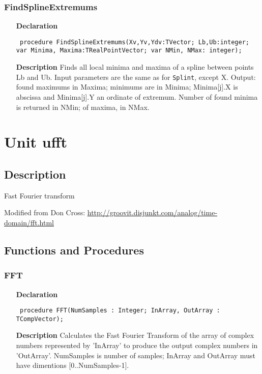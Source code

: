 \documentclass[12pt,a4paper,oneside]{report}
\newcommand{\declarationitem}[1]{\textbf{#1}}
\newcommand{\descriptiontitle}[1]{\textbf{#1}}
\newcommand{\code}[1]{\texttt{#1}}
\begin{document}
\subsubsection{FindSplineExtremums}
\label{uSpline-FindSplineExtremums}
\begin{itemize}\item[\declarationitem{Declaration}\hfill]
	\begin{flushleft}
		\code{
			procedure FindSplineExtremums(Xv,Yv,Ydv:TVector; Lb,Ub:integer; var Minima, Maxima:TRealPointVector; var NMin, NMax: integer);}
		
	\end{flushleft}
	
	\par
	\item[\descriptiontitle{Description}]
	Finds all local minima and maxima of a spline between points Lb and Ub. Input parameters are the same as for \code{Splint}, except X. Output: found maximums in Maxima; minimums are in Minima; Minima[j].X is abscissa and Minima[j].Y an ordinate of extremum. Number of found minima is returned in NMin; of maxima, in NMax.
	
\end{itemize}

\section{Unit ufft}
\label{ufft}
\subsection{Description}
Fast Fourier transform 

Modified from Don Cross: \href{http://groovit.disjunkt.com/analog/time-domain/fft.html}{http://groovit.disjunkt.com/analog/time-domain/fft.html}

\subsection{Functions and Procedures}
\subsubsection{FFT}
\label{ufft-FFT}
\begin{itemize}\item[\declarationitem{Declaration}\hfill]
	\begin{flushleft}
		\code{
			procedure FFT(NumSamples : Integer; InArray, OutArray : TCompVector);}
		
	\end{flushleft}
	
	\par
	\item[\descriptiontitle{Description}]
	Calculates the Fast Fourier Transform of the array of complex numbers represented by 'InArray' to produce the output complex numbers in 'OutArray'. NumSamples is number of samples; InArray and OutArray must have dimentions [0..NumSamples-1].
	
\end{itemize}
\end{document}

